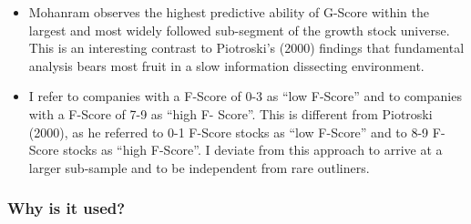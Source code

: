 \documentclass[12pt]{article}
\begin{document}
\begin{itemize}
            \item Mohanram observes the highest predictive ability of G-Score within the largest and most widely followed sub-segment of the growth stock universe. This is an interesting contrast to Piotroski’s (2000) findings that fundamental analysis bears most fruit in a slow information dissecting environment. \citep{Mohr2012}

            \item I refer to companies with a F-Score of 0-3 as “low F-Score” and to companies with a F-Score of 7-9 as “high F- Score”. This is different from Piotroski (2000), as he referred to 0-1 F-Score stocks as “low F-Score” and to 8-9 F-Score stocks as “high F-Score”. I deviate from this approach to arrive at a larger sub-sample and to be independent from rare outliners. \citep{Mohr2012}


        \end{itemize}

    \subsubsection{Why is it used?}
\end{document}
